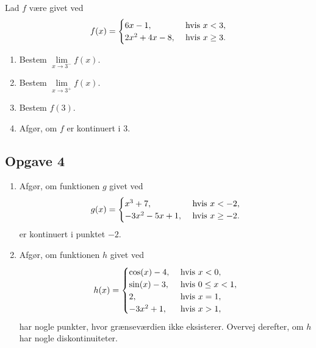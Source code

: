 Lad $f$ være givet ved
\begin{align*}
	f(x) =
	\begin{cases}
		6x - 1, &\textnormal{ hvis } x < 3,\\
		2x^2 + 4x - 8, &\textnormal{ hvis } x \geq 3. 
	\end{cases}
\end{align*}

\begin{enumerate}[label=\roman*)]
	\item Bestem $\lim\limits_{x \to 3^{-}}f(x).$
	\item Bestem $\lim\limits_{x \to 3^{+}}f(x).$
	\item Bestem $f(3)$.
	\item Afgør, om $f$ er kontinuert i 3.
\end{enumerate}

\subsection*{Opgave 4}
\begin{enumerate}[label=\roman*)]
	\item Afgør, om funktionen $g$ givet ved
	\begin{align*}
		g(x) = 
		\begin{cases}
			x^3 + 7, &\textnormal{ hvis } x < -2,\\
			-3x^2- 5x + 1, &\textnormal{ hvis } x \geq -2. 
		\end{cases}
	\end{align*}
	er kontinuert i punktet $-2$.
	\item Afgør, om funktionen $h$ givet ved
	\begin{align*}
		h(x) =		
		\begin{cases}
			\cos(x) - 4, &\textnormal{ hvis } x < 0,\\
			\sin(x) - 3, &\textnormal{ hvis } 0\leq x < 1, \\
			2, &\textnormal{ hvis } x = 1, \\
			-3x^2 + 1 , &\textnormal{ hvis } x > 1, \\ 
		\end{cases}
	\end{align*}
	har nogle punkter, hvor grænseværdien ikke eksisterer. Overvej derefter, om $h$ har nogle diskontinuiteter.
\end{enumerate}



